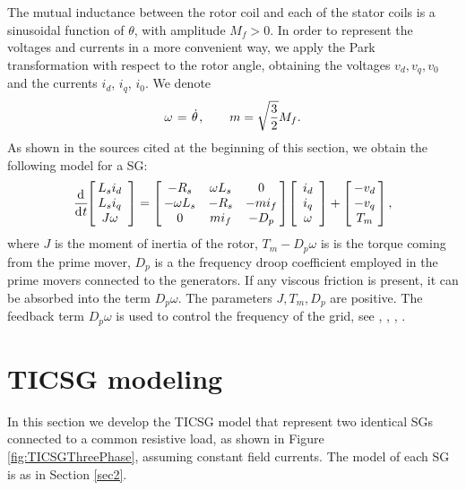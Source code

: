 \documentclass{ifacconf}
\newcommand{\BE}{\begin{equation}}
\newcommand{\BEQ}[1]{\BE\label{#1}} %
\renewcommand{\o}    {{\omega}}
\newcommand{\m}      {{\hbox{\hskip 1pt}}}
\newcommand{\nm}     {{\hbox{\hskip -3pt}}}
\newcommand{\dd}     {{\rm d\hbox{\hskip 0.5pt}}}
\begin{document}
The mutual inductance between the rotor coil and each of the stator
coils is a sinusoidal function of $\theta$, with amplitude $M_f>0$.
In order to represent the voltages and currents in a more convenient 
way, we apply the Park transformation with respect to the rotor 
angle, obtaining the voltages $v_d,v_q,v_0$ and the currents $i_d$, 
$i_q$, $i_0$. We denote \vspace{-1mm}
$$\o \m=\m \dot{\theta} \m,\qquad m=\sqrt{\frac{3}{2}}M_{f}.$$ 
As shown in the sources cited at the beginning of this section, we 
obtain the following model for a SG:
\BEQ{eq:SingleSGDynamics}
   \frac{\dd}{\dd t}\nm\left[\nm\begin{array}{c} L_s i_d\\ L_s i_q\\ 
   J\o\end{array} \right] = \left[\nm \begin{array}{ccc} -R_s & 
   \o L_s & 0\\ -\o L_s & -R_s & -mi_f\\ 0 & mi_f & -D_p \end{array}
   \nm\right] \nm \left[\begin{array}{c} i_d\\ i_q\\ \o 
   \end{array} \right] + \left[\nm \begin{array}{c} -v_d\\ -v_q
   \\ T_m \end{array} \nm\right],
\end{equation}
where $J$ is the moment of inertia of the rotor, $T_m-D_p\o$ is is the
torque coming from the prime mover, $D_p$ is a the frequency droop
coefficient employed in the prime movers connected to the
generators. If any viscous friction is present, it can be absorbed
into the term $D_p\o$. The parameters $J,T_m,D_p$ are positive.  The
feedback term $D_p\o$ is used to control the frequency of the grid,
see \cite{Kundur}, \cite{PoDoBu:13}, \cite{CaTa:14}, \cite{ZhWe:11}.

\section{TICSG modeling} \label{sec3} %

In this section we develop the TICSG model that represent two 
identical SGs connected to a common resistive load, as shown in
Figure \ref{fig:TICSGThreePhase}, assuming constant field currents.
The model of each SG is as in Section \ref{sec2}.
\end{document}
